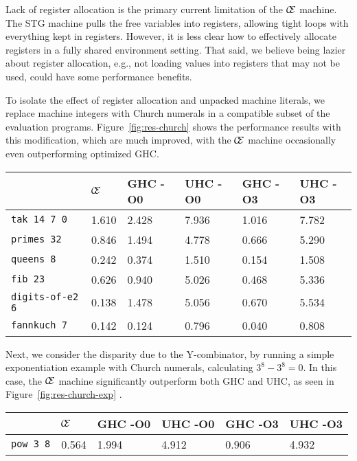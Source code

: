 Lack of register allocation is the primary current limitation of the $\mathcal{\mathcal{C} \mskip -4mu \mathcal{E}}$
machine. The STG machine pulls the free variables into registers, allowing tight
loops with everything kept in registers. However, it is less clear how to
effectively allocate registers in a fully shared environment setting.
That said, we believe being lazier about register allocation, e.g., not loading
values into registers that may not be used, could have some performance benefits.

To isolate the effect of register allocation and unpacked machine
literals, we replace machine integers with Church numerals in a compatible
subset of the evaluation programs. Figure~\ref{fig:res-church}
shows the performance results with this modification, which are much improved,
with the $\mathcal{\mathcal{C} \mskip -4mu \mathcal{E}}$ machine occasionally even outperforming optimized GHC.

\begin{figure*}
\centering
\begin{tabularx}{\textwidth}{l | X | X | X | X | X}
& $\mathcal{\mathcal{C} \mskip -4mu \mathcal{E}}$ & GHC -O0 & UHC -O0 & GHC -O3 & UHC -O3 \\
\hline
\texttt{tak 14 7 0} & 1.610 & 2.428 & 7.936 & 1.016 & 7.782 \\
\texttt{primes 32} & 0.846 & 1.494 & 4.778 & 0.666 & 5.290 \\
\texttt{queens 8} & 0.242 & 0.374 & 1.510 & 0.154 & 1.508 \\
\texttt{fib 23} & 0.626 & 0.940 & 5.026 & 0.468 & 5.336 \\
\texttt{digits-of-e2 6} & 0.138 & 1.478 & 5.056 & 0.670 & 5.534 \\
\texttt{fannkuch 7} & 0.142 & 0.124 & 0.796 & 0.040 & 0.808 \\
\end{tabularx}
\caption{Church Numeral Benchmark Results. Measurement is wall clock time, 
units are seconds. Times averaged over 5 runs.}
\label{fig:res-church}
\end{figure*}

Next, we consider the disparity due to the Y-combinator, by running a simple
exponentiation example with Church numerals, calculating $3^8 - 3^8 = 0$. In
this case, the $\mathcal{\mathcal{C} \mskip -4mu \mathcal{E}}$ machine significantly outperform both GHC and UHC,
as seen in Figure~\ref{fig:res-church-exp} .

\begin{figure*}
\begin{tabularx}{\textwidth}{l | X | X | X | X | X}
& $\mathcal{\mathcal{C} \mskip -4mu \mathcal{E}}$ & GHC -O0 & UHC -O0 & GHC -O3 & UHC -O3 \\
\hline
\texttt{pow 3 8} & 0.564 & 1.994 & 4.912 & 0.906 & 4.932 \\
\end{tabularx}
\caption{Church Numeral Exponentiation Benchmark Results. Measurement is wall clock time, 
units are seconds. Times averaged over 5 runs.}
\label{fig:res-church-exp}
\end{figure*}

